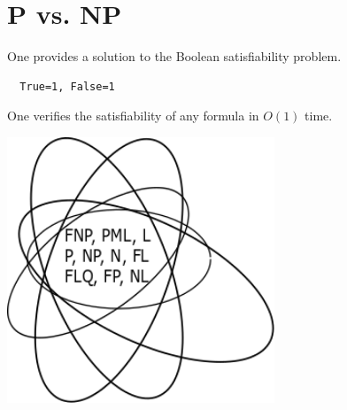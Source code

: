 \setcounter{section}{0}

\section{P vs. NP}
One provides a solution to 
the Boolean satisfiability 
problem.
\begin{center}
  \begin{verbatim}
  True=1, False=1
  \end{verbatim}
\end{center}
\vspace{-0.4cm}
One verifies 
the satisfiability 
of any formula in $O(1)$ time.
\begin{center}
  \includegraphics[width=0.6\textwidth]{venn.png}
\end{center}


